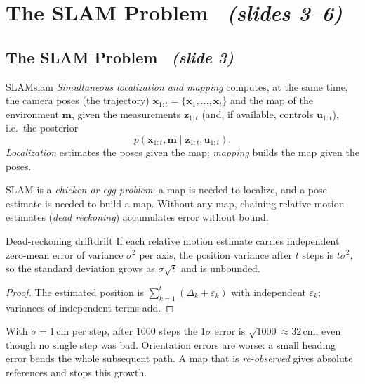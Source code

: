 \documentclass[11pt,a4paper]{article}
\newcommand{\slr}[1]{\texorpdfstring{\ \emph{(slides #1)}}{ (slides #1)}}
\newcommand{\slrs}[1]{\texorpdfstring{\ \emph{(slide #1)}}{ (slide #1)}}
\newcommand{\bx}{\mathbf{x}}
\newcommand{\bz}{\mathbf{z}}
\newcommand{\bu}{\mathbf{u}}
\newcommand{\bm}{\mathbf{m}}
\begin{document}
\section{The SLAM Problem \slr{3--6}}
\subsection{The SLAM Problem \slrs{3}}

\begin{definition}{SLAM}{slam}
\emph{Simultaneous localization and mapping} computes, at the same time, the camera poses (the trajectory) $\bx_{1:t}=\{\bx_1,\dots,\bx_t\}$ and the map of the environment $\bm$, given the measurements $\bz_{1:t}$ (and, if available, controls $\bu_{1:t}$), i.e.\ the posterior
\[
p(\bx_{1:t},\bm\mid \bz_{1:t},\bu_{1:t}).
\]
\emph{Localization} estimates the poses given the map; \emph{mapping} builds the map given the poses.
\end{definition}

SLAM is a \emph{chicken-or-egg problem}: a map is needed to localize, and a pose estimate is needed to build a map. Without any map, chaining relative motion estimates (\emph{dead reckoning}) accumulates error without bound.

\begin{proposition}{Dead-reckoning drift}{drift}
If each relative motion estimate carries independent zero-mean error of variance $\sigma^2$ per axis, the position variance after $t$ steps is $t\sigma^2$, so the standard deviation grows as $\sigma\sqrt t$ and is unbounded.
\end{proposition}
\begin{proof}
The estimated position is $\sum_{k=1}^t(\Delta_k+\varepsilon_k)$ with independent $\varepsilon_k$; variances of independent terms add. \qedhere
\end{proof}
\begin{intuition}
With $\sigma=1$\,cm per step, after $1000$ steps the $1\sigma$ error is $\sqrt{1000}\approx 32$\,cm, even though no single step was bad. Orientation errors are worse: a small heading error bends the whole subsequent path. A map that is \emph{re-observed} gives absolute references and stops this growth.
\end{intuition}
\end{document}
